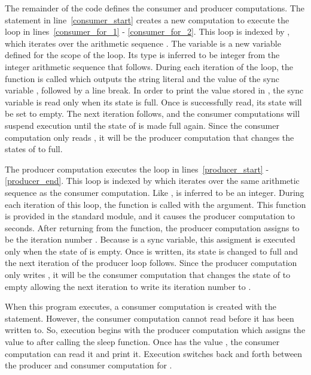 The remainder of the code defines the consumer and producer computations.
The  statement in line~\ref{consumer_start} creates a 
new computation to execute the 
loop in lines~\ref{consumer_for_1} - \ref{consumer_for_2}.  This loop is 
indexed by , which iterates over
the arithmetic sequence .  The variable  is a new
variable defined for the scope of the loop.  Its type is inferred to be integer from
the integer arithmetic sequence that follows.  During each iteration of the 
loop, the  function is called which outputs the string
literal  and the value of the sync variable , 
followed by a line break.  In order to print the value stored in , the
sync variable is read only when its state is full.  Once  is successfully
read, its state will be set to empty.  The next iteration follows, and the 
consumer computations will suspend execution until the state of  is 
made full again.  Since the consumer computation only reads , it will be 
the producer computation that changes the states of  to full.

The producer computation executes the  loop in lines~\ref{producer_start} -
\ref{producer_end}.  This
loop is indexed by  which iterates over the same arithmetic sequence
as the consumer computation.  Like ,  is inferred to be an integer.
During each iteration of this  loop, the  function is
called with the argument.  This  function is provided
in the  standard module, and it causes the producer computation to
 seconds.  After returning from the  function, 
the producer computation assigns  to be the iteration number .  
Because  is a sync variable, this assigment is executed only when the state of 
 is empty.  Once  is written, its state is changed to full and the
next iteration of the producer loop follows.  Since the producer computation only
writes , it will be the consumer computation that changes the state of
 to empty allowing the next iteration to write its iteration number
to .

When this program executes, a consumer computation is created with the 
statement.
However, the consumer computation cannot read  before it has been written
to.  So, execution begins with the producer computation which assigns the value
 to  after calling the sleep function.  Once  has the
value , the consumer computation can read it and print it.  Execution
switches back and forth between the producer and consumer computation for
.  


